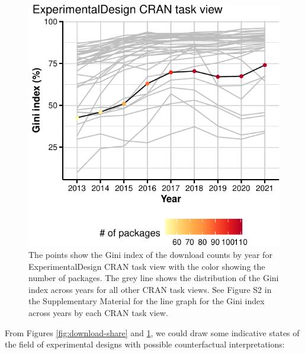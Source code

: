 \documentclass{article}
\begin{document}
\begin{figure}[htbp]

{\centering \includegraphics{figures/fig-gini-all-ctvs-1} 

}

\caption{The points show the Gini index of the download counts by year for ExperimentalDesign CRAN task view with the color showing the number of packages. The grey line shows the distribution of the Gini index across years for all other CRAN task views. See Figure S2 in the Supplementary Material for the line graph for the Gini index across years by each CRAN task view.}\label{fig:fig-gini-all-ctvs}
\end{figure}

From Figures \ref{fig:download-share} and \ref{fig:fig-gini-all-ctvs},
we could draw some indicative states of the field of experimental
designs with possible counterfactual interpretations:
\end{document}
